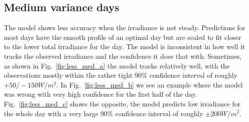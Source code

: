 \subsection{Medium variance days}
The model shows less accuracy when the irradiance is not steady. Predictions for most days have the smooth profile of an optimal day but are scaled to fit closer to the lower total irradiance for the day. The model is inconsistent in how well it tracks the observed irradiance and the confidence it does that with. Sometimes, as shown in Fig.~\ref{fig:less_med_a} the model tracks relatively well, with the observations mostly within the rather tight 90\% confidence interval of roughly $+50/-150 W/m^2$. In Fig.~\ref{fig:less_med_b} we see an example where the model was wrong with very high confidence for the first half of the day. Fig.~\ref{fig:less_med_c} shows the opposite, the model predicts low irradiance for the whole day with a very large 90\% confidence interval of roughly $\pm200 W/m^2$.
